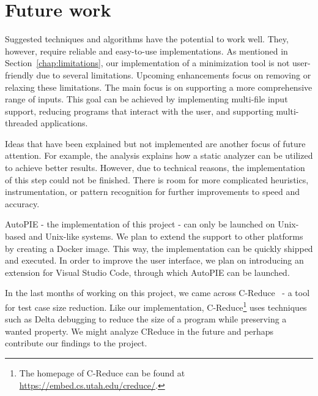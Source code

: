 \section{Future work}

Suggested techniques and algorithms have the potential to work well. 
They, however, require reliable and easy-to-use implementations. 
As mentioned in Section~\ref{chap:limitations}, our implementation of 
a minimization tool is not user-friendly due to several limitations. 
Upcoming enhancements focus on removing or relaxing these limitations. 
The main focus is on supporting a more comprehensive range of inputs. 
This goal can be achieved by implementing multi-file input support, reducing 
programs that interact with the user, and supporting multi-threaded 
applications.

Ideas that have been explained but not implemented are another focus of 
future attention. 
For example, the analysis explains how a static analyzer can be utilized to 
achieve better results. 
However, due to technical reasons, the implementation of this step could not 
be finished. 
There is room for more complicated heuristics, instrumentation, or pattern 
recognition for further improvements to speed and accuracy.

AutoPIE - the implementation of this project - can only be launched on 
Unix-based and Unix-like systems. 
We plan to extend the support to other platforms by creating a Docker image. 
This way, the implementation can be quickly shipped and executed. 
In order to improve the user interface, we plan on introducing an extension 
for Visual Studio Code, through which AutoPIE can be launched.

In the last months of working on this project, we came across 
C-Reduce~\citep{CReduce12} - a tool for test case size reduction. 
Like our implementation, C-Reduce\footnote{The homepage of C-Reduce can be
found at \url{https://embed.cs.utah.edu/creduce/}.} uses techniques such as 
Delta debugging to reduce the size of a program while preserving a wanted 
property. 
We might analyze CReduce in the future and perhaps contribute our findings 
to the project.
